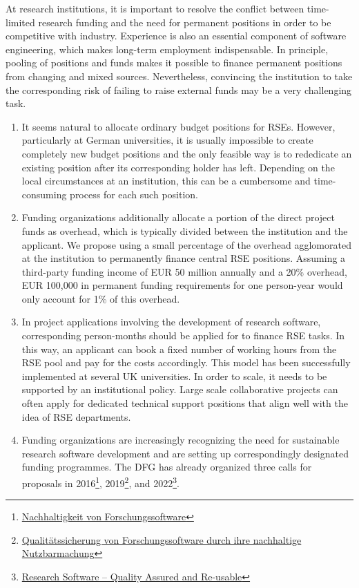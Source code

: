 \documentclass[a4paper]{article}
\begin{document}
At research institutions, it is important to resolve the conflict between time-limited research funding and the need for permanent positions in order to be competitive with industry.
Experience is also an essential component of software engineering, which makes long-term employment indispensable.
In principle, pooling of positions and funds makes it possible to finance permanent positions from changing and mixed sources.
Nevertheless, convincing the institution to take the corresponding risk of failing to raise external funds may be a very challenging task.
\begin{enumerate}
\item It seems natural to allocate ordinary budget positions for RSEs.
      However, particularly at German universities, it is usually impossible to create completely new budget positions and the only feasible way is to rededicate an existing position after its corresponding holder has left.
      Depending on the local circumstances at an institution, this can be a cumbersome and time-consuming process for each such position.
\item Funding organizations additionally allocate a portion of the direct project funds as overhead, which is typically divided between the institution and the applicant.
      We propose using a small percentage of the overhead agglomorated at the institution to permanently finance central RSE positions.
      Assuming a third-party funding income of EUR 50 million annually and a 20\% overhead, EUR 100,000 in permanent funding requirements for one person-year would only account for 1\% of this overhead.
\item In project applications involving the development of research software, corresponding person-months should be applied for to finance RSE tasks.
      In this way, an applicant can book a fixed number of working hours from the RSE pool and pay for the costs accordingly.
      This model has been successfully implemented at several UK universities.
      In order to scale, it needs to be supported by an institutional policy.
      Large scale collaborative projects can often apply for dedicated technical support positions that align well with the idea of RSE departments.
\item Funding organizations are increasingly recognizing the need for sustainable research software
      development and are setting up correspondingly designated funding programmes.
      The DFG has already organized three calls for proposals in 2016\footnote{\href{https://www.dfg.de/resource/blob/172674/1bcb181a6451fdac9d94421776b52798/161026-dfg-ausschreibung-forschungssoftware-de-data.pdf}{Nachhaltigkeit von Forschungssoftware}}, 2019\footnote{\href{https://www.dfg.de/de/aktuelles/neuigkeiten-themen/info-wissenschaft/2019/info-wissenschaft-19-44}{Qualitätssicherung von Forschungssoftware durch ihre nachhaltige Nutzbarmachung}}, and 2022\footnote{\href{https://www.dfg.de/en/news/news-topics/announcements-proposals/2022/info-wissenschaft-22-85}{Research Software – Quality Assured and Re-usable}}.

\end{enumerate}
\end{document}

